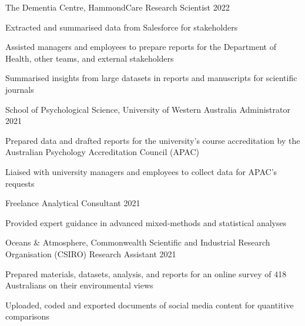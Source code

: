 \begin{cventries}
  \cventry
    {The Dementia Centre, HammondCare} %
    {Research Scientist} %
    {}%
    {2022} %
    { %
      \begin{cvitems}
        \item Extracted and summarised data from Salesforce for stakeholders
         \item Assisted managers and employees to prepare reports for the Department of Health, other teams, and external stakeholders
         \item Summarised insights from large datasets in reports and manuscripts for scientific journals  
      \end{cvitems}
    }

  \cventry
    {School of Psychological Science, University of Western Australia} %
    {Administrator} %
    {}%
    {2021} %
    { %
      \begin{cvitems}
        \item Prepared data and drafted reports for the university's course accreditation by the Australian Psychology Accreditation Council (APAC)
        \item Liaised with university managers and employees to collect data for APAC's requests
      \end{cvitems}
    }

  \cventry
    {Freelance} %
    {Analytical Consultant} %
    {}%
    {2021} %
    { %
      \begin{cvitems}
        \item Provided expert guidance in advanced mixed-methods and statistical analyses
      \end{cvitems}
    }
    
  \cventry
    {Oceans \& Atmosphere, Commonwealth Scientific and Industrial Research Organisation (CSIRO)} %
    {Research Assistant} %
    {}%
    {2021} %
    { %
      \begin{cvitems}
        \item Prepared materials, datasets, analysis, and reports for an online survey of 418 Australians on their environmental views
        \item Uploaded, coded and exported documents of social media content for quantitive comparisons
      \end{cvitems}
    }


\end{cventries}
